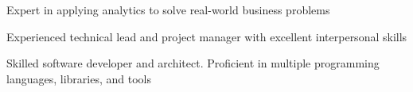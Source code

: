 

\vspace{-4mm}

\cventry
{} %
{} %
{} %
{} %
{
\begin{cvitems} %
\item  {Expert in applying analytics to solve real-world business problems} %
\item  {Experienced technical lead and project manager with excellent interpersonal skills} 
\item  {Skilled software developer and architect. Proficient in multiple programming languages, libraries, and tools} 
\end{cvitems}    
}

